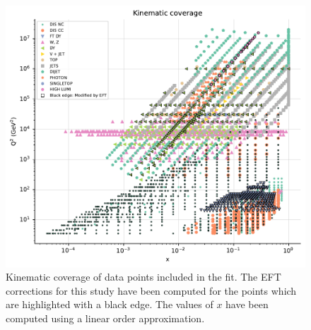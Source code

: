 \documentclass[withindex,glossary]{cam-thesis}
\begin{document}
\begin{figure}[H]
  \centering
  \includegraphics[width=\textwidth]{Figures/xq2.pdf}
  \caption{Kinematic coverage of data points included in the fit. The EFT corrections
  for this study have been computed for the points which are highlighted with a black
  edge. The values of $x$ have been computed using a linear order approximation. \label{fig:xq2}}
\end{figure}
\end{document}
